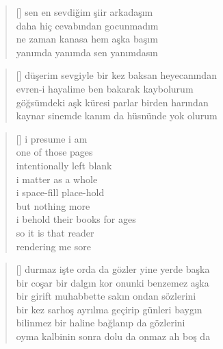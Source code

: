 \documentclass[10pt, openright, twoside]{memoir}
\theoremstyle{definition}
\begin{document}
\vspace*{\fill}
\settowidth{\versewidth}{sen en sevdiğim şiir arkadaşım}
\begin{verse}[\versewidth]
  sen en sevdiğim şiir arkadaşım \\
  daha hiç cevabından gocunmadım \\
  ne zaman kanasa hem aşka başım \\
  yanımda yanımda sen yanımdasın \\
\end{verse}
\vspace*{\fill}
%
\newpage
{}
\vspace*{\fill}
\settowidth{\versewidth}{düşerim sevgiyle bir kez baksan heyecanından}
\begin{verse}[\versewidth]
  düşerim sevgiyle bir kez baksan heyecanından \\
  evren-i hayalime ben bakarak kaybolurum \\
  göğsümdeki aşk küresi parlar birden harından \\
  kaynar sinemde kanım da hüsnünde yok olurum \\
\end{verse}
\vspace*{\fill}
%
\newpage
{}
\vspace*{\fill}
\settowidth{\versewidth}{i behold their books for ages}
\begin{verse}[\versewidth]
  i presume i am \\
  one of those pages \\
  intentionally left blank \\
  i matter as a whole \\
  i space-fill place-hold \\
  but nothing more \\
  i behold their books for ages \\
  so it is that reader \\
  rendering me sore \\
\end{verse}
\vspace*{\fill}
%
\newpage
{}
\vspace*{\fill}
\settowidth{\versewidth}{bir coşar bir dalgın kor onunki benzemez aşka}
\begin{verse}[\versewidth]
  durmaz işte orda da gözler yine yerde başka \\
  bir coşar bir dalgın kor onunki benzemez aşka \\
  bir girift muhabbette sakın ondan sözlerini \\
  bir kez sarhoş ayrılma geçirip günleri baygın \\
  bilinmez bir haline bağlanıp da gözlerini \\
  oyma kalbinin sonra dolu da onmaz ah boş da \\
\end{verse}
\end{document}
